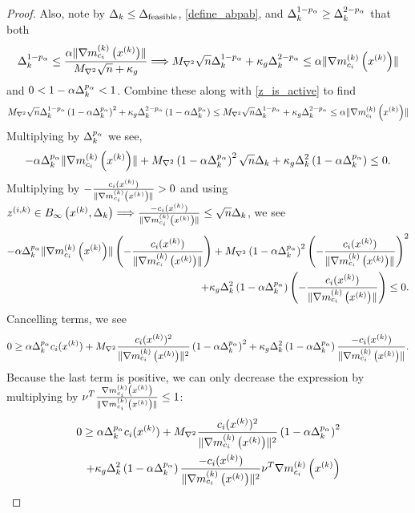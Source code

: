 \begin{proof}
Also, note by $\Delta_k \le {\Delta_{\textrm{feasible}}}$, \cref{define_abpab}, and $\Delta_k^{1 - p_{\alpha}} \ge \Delta_k^{2 - p_{\alpha}}$ that both
\begin{align*}
\Delta_k^{1-p_{\alpha}} \le \frac{\alpha \|{\nabla m_{c_i}^{(k)}\left(x^{(k)}\right)}\|}{{M_{\nabla^2}} \sqrt{n} + \kappa_g} 
\Longrightarrow {M_{\nabla^2}} \sqrt{n}\Delta_k^{1- p_{\alpha}} + \kappa_g \Delta_k^{2 - p_{\alpha}} \le \alpha \|{\nabla m_{c_i}^{(k)}\left(x^{(k)}\right)}\|
\end{align*}
and $0 < 1 - \alpha \Delta_k^{p_{\alpha}} < 1$.
Combine these along with \cref{z_is_active} to find 
\begin{align*}
{M_{\nabla^2}} \sqrt{n}\Delta_k^{1-p_{\alpha}}\left(1 - \alpha \Delta_k^{p_{\alpha}}\right)^2  + \kappa_g \Delta_k^{2 - p_{\alpha}} \left(1 - \alpha \Delta_k^{p_{\alpha}}\right)
\le {M_{\nabla^2}} \sqrt{n}\Delta_k^{1 - p_{\alpha}} + \kappa_g \Delta_k^{2 - p_{\alpha}} \le \alpha \|{\nabla m_{c_i}^{(k)}\left(x^{(k)}\right)}\|
\end{align*}
Multiplying by $\Delta_k^{p_{\alpha}}$ we see,
\begin{align*}
-\alpha \Delta_k^{p_{\alpha}}\|{\nabla m_{c_i}^{(k)}\left(x^{(k)}\right)}\| + {M_{\nabla^2}} \left(1 - \alpha \Delta_k^{p_{\alpha}}\right)^2 \sqrt{n}\Delta_k+ \kappa_g \Delta_k^2 \left(1 - \alpha \Delta_k^{p_{\alpha}}\right) \le  0.
\end{align*}
Multiplying by $-\frac{c_i(x^{(k)})}{\|{\nabla m_{c_i}^{(k)}\left(x^{(k)}\right)}\|} > 0$ and using ${z^{(i, k)}} \in { B_{\infty}\left(x^{(k)}, \Delta_k\right) } \Longrightarrow \frac{-c_i(x^{(k)})}{\|{\nabla m_{c_i}^{(k)}\left(x^{(k)}\right)}\|} \le \sqrt{n}\Delta_k$, we see
\begin{align*}
-\alpha \Delta_k^{p_{\alpha}}\|{\nabla m_{c_i}^{(k)}\left(x^{(k)}\right)}\|\left(-\frac{c_i(x^{(k)})}{\|{\nabla m_{c_i}^{(k)}\left(x^{(k)}\right)}\|}\right) + {M_{\nabla^2}} \left(1 - \alpha \Delta_k^{p_{\alpha}}\right)^2 \left(-\frac{c_i(x^{(k)})}{\|{\nabla m_{c_i}^{(k)}\left(x^{(k)}\right)}\|}\right)^2\\
+\kappa_g \Delta_k^2 \left(1 - \alpha \Delta_k^{p_{\alpha}}\right)\left(-\frac{c_i(x^{(k)})}{\|{\nabla m_{c_i}^{(k)}\left(x^{(k)}\right)}\|}\right) \le 0.
\end{align*}
Cancelling terms, we see
\begin{align*}
0 \ge \alpha \Delta_k^{p_{\alpha}} c_i(x^{(k)}) + {M_{\nabla^2}} \frac {c_i(x^{(k)})^2}{\|{\nabla m_{c_i}^{(k)}\left(x^{(k)}\right)}\|^2}\left(1 - \alpha \Delta_k^{p_{\alpha}}\right)^2 + \kappa_g \Delta_k^2 \left(1 - \alpha \Delta_k^{p_{\alpha}}\right)\frac{-c_i(x^{(k)})}{\|{\nabla m_{c_i}^{(k)}\left(x^{(k)}\right)}\|}.
\end{align*}
Because the last term is positive, we can only decrease the expression by multiplying by $\nu^T \frac{{\nabla m_{c_i}^{(k)}\left(x^{(k)}\right)}}{\|{\nabla m_{c_i}^{(k)}\left(x^{(k)}\right)}\|} \le 1$:
\begin{align*}
0\ge \alpha \Delta_k^{p_{\alpha}} c_i(x^{(k)}) + {M_{\nabla^2}} \frac {c_i(x^{(k)})^2}{\|{\nabla m_{c_i}^{(k)}\left(x^{(k)}\right)}\|^2}\left(1 - \alpha \Delta_k^{p_{\alpha}}\right)^2  \\
+ \kappa_g \Delta_k^2 \left(1 - \alpha \Delta_k^{p_{\alpha}}\right)\frac{-c_i(x^{(k)})}{\|{\nabla m_{c_i}^{(k)}\left(x^{(k)}\right)}\|^2}\nu^T{\nabla m_{c_i}^{(k)}\left(x^{(k)}\right)}
\end{align*}

\end{proof}
